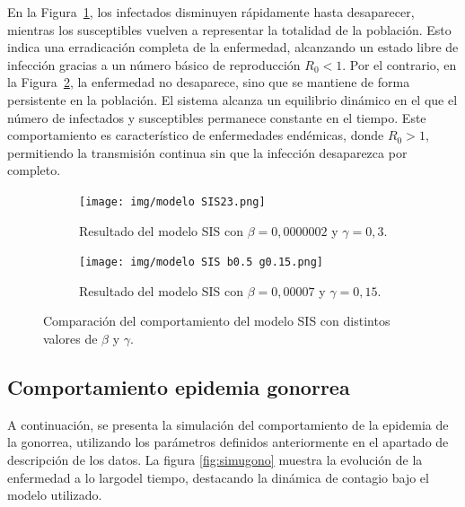 En la Figura~\ref{fig:simulacion2_SIS}, los infectados disminuyen rápidamente hasta desaparecer, mientras los susceptibles vuelven a representar la totalidad de la población. Esto indica una erradicación completa de la enfermedad, alcanzando un estado libre de infección gracias a un número básico de reproducción $R_0 < 1$.
Por el contrario, en la Figura~\ref{fig:simulacion3_SIS}, la enfermedad no desaparece, sino que se mantiene de forma persistente en la población. El sistema alcanza un equilibrio dinámico en el que el número de infectados y susceptibles permanece constante en el tiempo. Este comportamiento es característico de enfermedades endémicas, donde $R_0 > 1$, permitiendo la transmisión continua sin que la infección desaparezca por completo.

\begin{figure}[H]
    \begin{subfigure}[b]{0.9\linewidth}
        \centering
        \texttt{[image: img/modelo SIS23.png]}
        \caption{Resultado del modelo SIS con $\beta = 0{,}0000002$ y $\gamma = 0{,}3$.}
        \label{fig:simulacion2_SIS}
    \end{subfigure}
    
    \vspace{0.5cm}

    \begin{subfigure}[b]{0.9\linewidth}
        \centering
        \texttt{[image: img/modelo SIS b0.5 g0.15.png]}
        \caption{Resultado del modelo SIS con $\beta = 0{,}00007$ y $\gamma = 0{,}15$.}
        \label{fig:simulacion3_SIS}
    \end{subfigure}

    \caption{Comparación del comportamiento del modelo SIS con distintos valores de $\beta$ y $\gamma$.}
    \label{fig:comparacion_SIS}
\end{figure}





\subsection{Comportamiento epidemia gonorrea}
A continuación, se presenta  la simulación del comportamiento de la epidemia de la gonorrea, utilizando los parámetros definidos anteriormente en el apartado de descripción de los datos. La figura \ref{fig:simugono} muestra la evolución de la enfermedad a lo largodel tiempo, destacando la dinámica de contagio bajo el modelo utilizado.

